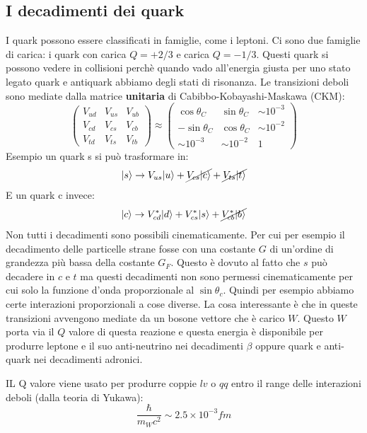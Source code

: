 \subsection{I decadimenti dei quark}
I quark possono essere classificati in famiglie, come i leptoni. Ci sono due famiglie di carica: i quark con carica $Q=+2/3$ e carica $Q=-1/3$. Questi quark si possono vedere in collisioni perchè quando vado all'energia giusta per uno stato legato quark e antiquark abbiamo degli stati di risonanza. Le transizioni deboli sono mediate dalla matrice \textbf{unitaria} di Cabibbo-Kobayashi-Maskawa (CKM):
\begin{equation*}
    \begin{pmatrix} V_{ud} & V_{us} & V_{ub} \\ V_{cd} &
V_{cs} & V_{cb} \\ V_{td} & V_{ts} &
V_{tb}\end{pmatrix}\approx\begin{pmatrix} \cos{\theta_{C}} & \sin{\theta_{C}} & \sim10^{-3} \\ -\sin{\theta_{C}} &
\cos{\theta_{C}} & \sim10^{-2} \\ \sim10^{-3} & \sim10^{-2} &
1\end{pmatrix}
\end{equation*}
Esempio un quark s si può trasformare in:
\begin{equation*}
    |s\rangle\to V_{us}|u\rangle+\cancel{V_{cs}|c\rangle}+\cancel{V_{ts}|t\rangle}
\end{equation*}
E un quark c invece:
\begin{equation*}
    |c\rangle\to V^*_{cd}|d\rangle+V^*_{cs}|s\rangle+\cancel{V^*_{cb}|b\rangle}
\end{equation*}
Non tutti i decadimenti sono possibili cinematicamente. Per cui per esempio il decadimento delle particelle strane fosse con una costante $G$ di un'ordine di grandezza più bassa della costante $G_F$. Questo è dovuto al fatto che $s$ può decadere in $c$ e $t$ ma questi decadimenti non sono permessi cinematicamente per cui solo la funzione d'onda proporzionale al $\sin{\theta_c}$. Quindi per esempio abbiamo certe interazioni proporzionali a cose diverse. La cosa interessante è che in queste transizioni avvengono mediate da un bosone vettore che è carico $W$. Questo $W$ porta via il $Q$ valore di questa reazione e questa energia è disponibile per produrre leptone e il suo anti-neutrino nei decadimenti $\beta$ oppure quark e anti-quark nei decadimenti adronici.

IL Q valore viene usato per produrre coppie $lv$ o $qq$ entro il range delle interazioni deboli (dalla teoria di Yukawa):
\begin{equation*}
    \frac{\hbar}{m_Wc^2}\sim2.5\times10^{-3}fm
\end{equation*}
